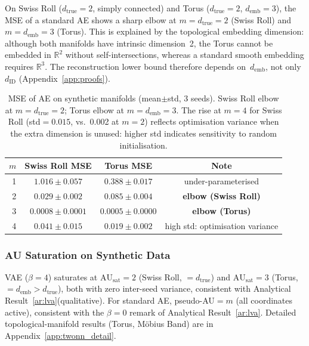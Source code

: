 \documentclass[11pt,a4paper]{article}
\newcommand{\dID}{d_{\mathrm{ID}}}
\newcommand{\R}{\mathbb{R}}
\newcommand{\AUsat}{\mathrm{AU}_{\mathrm{sat}}}
\begin{document}
On Swiss Roll ($d_{\mathrm{true}}=2$, simply connected) and
Torus ($d_{\mathrm{true}}=2$, $d_{\mathrm{emb}}=3$), the MSE of a standard AE
shows a sharp elbow at $m=d_{\mathrm{true}}=2$ (Swiss Roll) and
$m=d_{\mathrm{emb}}=3$ (Torus).
This is explained by the topological embedding dimension: although both manifolds
have intrinsic dimension~2, the Torus cannot be embedded in $\R^2$ without
self-intersections, whereas a standard smooth embedding requires $\R^3$.
The reconstruction lower bound therefore depends on~$d_{\mathrm{emb}}$, not
only~$\dID$ (Appendix~\ref{app:proofs}).

\begin{table}[ht]
\centering
\caption{MSE of AE on synthetic manifolds (mean$\pm$std, 3 seeds).
Swiss Roll elbow at $m=d_{\mathrm{true}}=2$; Torus elbow at $m=d_{\mathrm{emb}}=3$.
The rise at $m=4$ for Swiss Roll (std$=0.015$, vs.\ 0.002 at $m=2$) reflects
optimisation variance when the extra dimension is unused: higher std indicates
sensitivity to random initialisation.}
\label{tab:e1}
\small
\begin{tabular}{rccc}
\toprule
$m$ & Swiss Roll MSE & Torus MSE & Note \\
\midrule
1 & $1.016\pm0.057$ & $0.388\pm0.017$ & under-parameterised \\
2 & $\boldsymbol{0.029\pm0.002}$ & $0.085\pm0.004$ & \textbf{elbow (Swiss Roll)} \\
3 & $0.0008\pm0.0001$ & $\boldsymbol{0.0005\pm0.0000}$ & \textbf{elbow (Torus)} \\
4 & $0.041\pm0.015$ & $0.019\pm0.002$ & high std: optimisation variance \\
\bottomrule
\end{tabular}
\end{table}

\subsubsection{AU Saturation on Synthetic Data}

VAE ($\beta=4$) saturates at $\AUsat=2$ (Swiss Roll, $=d_{\mathrm{true}}$) and
$\AUsat=3$ (Torus, $=d_{\mathrm{emb}}>d_{\mathrm{true}}$), both with zero
inter-seed variance, consistent with Analytical Result~\ref{ar:lva}(qualitative).
For standard AE, pseudo-AU$=m$ (all coordinates active), consistent with
the $\beta=0$ remark of Analytical Result~\ref{ar:lva}.
Detailed topological-manifold results (Torus, Möbius Band) are in
Appendix~\ref{app:twonn_detail}.

\end{document}
